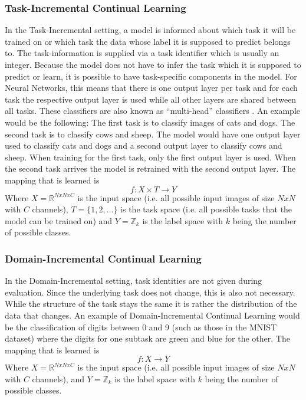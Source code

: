 \subsubsection{Task-Incremental Continual Learning}
\label{sec:TaskIncrementalContinualLearning}
In the Task-Incremental setting, a model is informed about which task it will be trained on or which task the data whose label it is supposed to predict belongs to.
The task-information is supplied via a task identifier which is usually an integer. Because the model does not have to infer the task which it is supposed to predict
or learn, it is possible to have task-specific components in the model. For Neural Networks, this means that there is one output layer per task and for each task the
respective output layer is used while all other layers are shared between all tasks. These classifiers are also known as \enquote{multi-head} classifiers \cite{vandeven2019generative}.
An example would be the following: The first task is to classify images of cats and dogs. The second task is to classify cows and sheep. The model would have one output layer 
used to classify cats and dogs and a second output layer to classify cows and sheep. When training for the first task, only the first output layer is used. When the second task
arrives the model is retrained with the second output layer.  The mapping that is learned is 
\begin{equation}
    f: X \times T \rightarrow Y
\end{equation}
Where $X = \mathbb{R}^{N x N x C}$ is the input space (i.e. all possible input images of size $N x N$ with $C$ channels), $T = \{1,2,\ldots\}$ is the task space (i.e. all possible
tasks that the model can be trained on) and $Y = \mathbb{Z}_{k}$ is the label space with $k$ being the number of possible classes.
\subsubsection{Domain-Incremental Continual Learning}
\label{sec:DomainIncrementalContinualLearning}
In the Domain-Incremental setting, task identities are not given during evaluation. Since the underlying task does not change, this is also not necessary. While the structure of the task
stays the same it is rather the distribution of the data that changes. An example of Domain-Incremental Continual Learning would be the classification of digits between 0 and 9 (such as
those in the MNIST \cite{mnist_web} dataset) where the digits for one subtask are green and blue for the other. The mapping that is learned is 
\begin{equation}
    f: X \rightarrow Y
\end{equation}
Where $X = \mathbb{R}^{N x N x C}$ is the input space (i.e. all possible input images of size $N x N$ with $C$ channels), and $Y = \mathbb{Z}_{k}$ is the label space with $k$ being the
number of possible classes.

